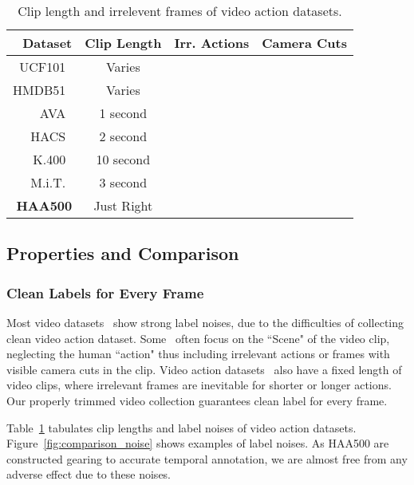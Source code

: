 \documentclass[10pt,twocolumn,letterpaper]{article}
\begin{document}
\setlength{\tabcolsep}{4pt}
\begin{table}[t]
\begin{center}
\begin{tabular}{|r|c|c|c|}
\hline 
Dataset                     & Clip Length & Irr. Actions & Camera Cuts  \\ \hline
UCF101~\cite{ucf101}        & Varies      &      &  \\ \hline
HMDB51~\cite{HMDB51}        & Varies      &      &   \\ \hline
AVA~\cite{AVA}              & 1 second    &       &   \\ \hline
HACS~\cite{zhao2019hacs}    & 2 second    &       &  \\ \hline
K.400~\cite{kinetics400}    & 10 second   &       &   \\ \hline
M.i.T.~\cite{momentsintime} & 3 second    &      &  \\ \hline
\textbf{HAA500}             & Just Right  &      &  \\ \hline
\end{tabular}
\end{center}
\caption{Clip length and irrelevent frames of video action datasets.}
\label{table:comparison_sampling_rate}

\end{table}
\setlength{\tabcolsep}{1.4pt}

\subsection{Properties and Comparison}

\subsubsection{Clean Labels for Every Frame}


Most video datasets~\cite{AVA,kinetics400,ucf101} show strong label noises, due to the difficulties of collecting clean video action dataset. Some~\cite{kinetics400,HMDB51,ucf101} often focus on the ``Scene" of the video clip, neglecting the human ``action" thus including irrelevant actions or frames with visible camera cuts in the clip. Video action datasets~\cite{AVA,kinetics400,momentsintime,zhao2019hacs} also have a fixed length of video clips, where irrelevant frames are inevitable for shorter or longer actions. Our properly trimmed video collection guarantees clean label for every frame. 

Table~\ref{table:comparison_sampling_rate} tabulates clip lengths and label noises of video action datasets. 
Figure~\ref{fig:comparison_noise} shows examples of label noises. As HAA500 are constructed gearing to accurate temporal annotation, we are almost free from any adverse effect due to these noises.
\end{document}
